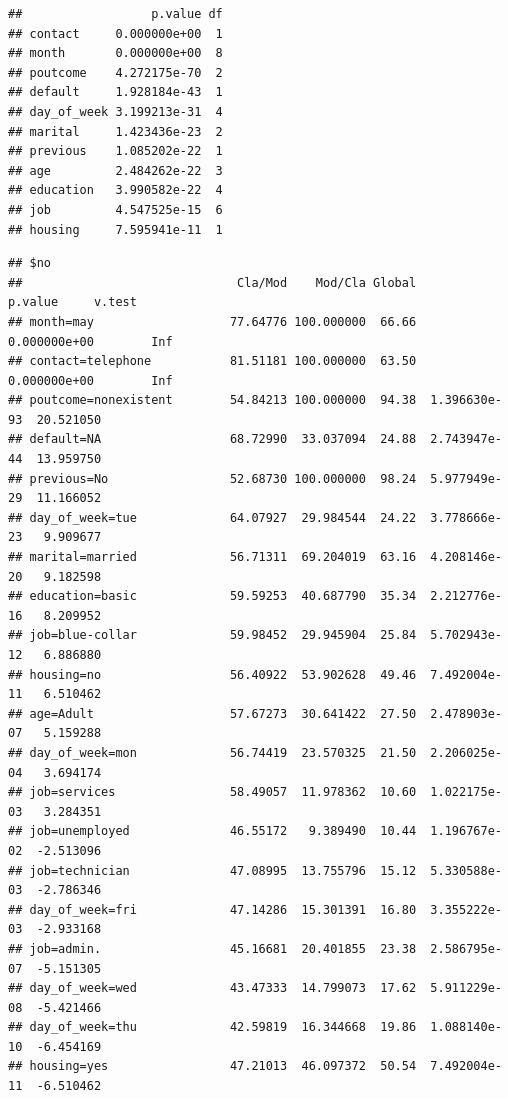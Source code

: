 \documentclass[
]{article}
\newenvironment{Shaded}{\begin{snugshade}}{\end{snugshade}}
\newcommand{\NormalTok}[1]{#1}
\newcommand{\SpecialCharTok}[1]{\textcolor[rgb]{0.00,0.00,0.00}{#1}}
\begin{document}
\begin{verbatim}
##                  p.value df
## contact     0.000000e+00  1
## month       0.000000e+00  8
## poutcome    4.272175e-70  2
## default     1.928184e-43  1
## day_of_week 3.199213e-31  4
## marital     1.423436e-23  2
## previous    1.085202e-22  1
## age         2.484262e-22  3
## education   3.990582e-22  4
## job         4.547525e-15  6
## housing     7.595941e-11  1
\end{verbatim}

\begin{Shaded}
\end{Shaded}

\begin{verbatim}
## $no
##                              Cla/Mod    Mod/Cla Global       p.value     v.test
## month=may                   77.64776 100.000000  66.66  0.000000e+00        Inf
## contact=telephone           81.51181 100.000000  63.50  0.000000e+00        Inf
## poutcome=nonexistent        54.84213 100.000000  94.38  1.396630e-93  20.521050
## default=NA                  68.72990  33.037094  24.88  2.743947e-44  13.959750
## previous=No                 52.68730 100.000000  98.24  5.977949e-29  11.166052
## day_of_week=tue             64.07927  29.984544  24.22  3.778666e-23   9.909677
## marital=married             56.71311  69.204019  63.16  4.208146e-20   9.182598
## education=basic             59.59253  40.687790  35.34  2.212776e-16   8.209952
## job=blue-collar             59.98452  29.945904  25.84  5.702943e-12   6.886880
## housing=no                  56.40922  53.902628  49.46  7.492004e-11   6.510462
## age=Adult                   57.67273  30.641422  27.50  2.478903e-07   5.159288
## day_of_week=mon             56.74419  23.570325  21.50  2.206025e-04   3.694174
## job=services                58.49057  11.978362  10.60  1.022175e-03   3.284351
## job=unemployed              46.55172   9.389490  10.44  1.196767e-02  -2.513096
## job=technician              47.08995  13.755796  15.12  5.330588e-03  -2.786346
## day_of_week=fri             47.14286  15.301391  16.80  3.355222e-03  -2.933168
## job=admin.                  45.16681  20.401855  23.38  2.586795e-07  -5.151305
## day_of_week=wed             43.47333  14.799073  17.62  5.911229e-08  -5.421466
## day_of_week=thu             42.59819  16.344668  19.86  1.088140e-10  -6.454169
## housing=yes                 47.21013  46.097372  50.54  7.492004e-11  -6.510462

\end{verbatim}
\end{document}
